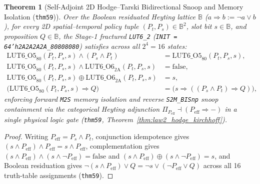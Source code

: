 \documentclass[11pt,letterpaper]{article}
\theoremstyle{spectralthm}
\newtheorem{theorem}{Theorem}[section]
\begin{document}
\begin{theorem}[Self-Adjoint 2D Hodge--Tarski Bidirectional Snoop and Memory Isolation (\texttt{thm59})]
\label{thm:hodge_tarski_snoop}
Over the Boolean residuated Heyting lattice $\mathbb{B}$ ($a \Rightarrow b := \neg a \vee b$), for every 2D spatial--temporal policy tuple $(P_t, P_s) \in \mathbb{B}^2$, slot bit $s \in \mathbb{B}$, and proposition $Q \in \mathbb{B}$, the Stage-1 fractured \texttt{LUT6\_2} (\texttt{INIT = 64'h2A2A2A2A\_80808080}) satisfies across all $2^4 = 16$ states:
\begin{equation}
\label{eq:hodge_tarski_snoop}
\begin{aligned}
\mathrm{LUT6\_O5}_{80}(P_t,P_s,s) \wedge (P_s \wedge P_t) &= \mathrm{LUT6\_O5}_{80}(P_t,P_s,s), \\
\mathrm{LUT6\_O5}_{80}(P_t,P_s,s) \wedge \mathrm{LUT6\_O6}_{2\mathrm{A}}(P_t,P_s,s) &= \mathrm{false}, \\
\mathrm{LUT6\_O5}_{80}(P_t,P_s,s) \oplus \mathrm{LUT6\_O6}_{2\mathrm{A}}(P_t,P_s,s) &= s, \\
\bigl(\mathrm{LUT6\_O5}_{80}(P_t,P_s,s) \Rightarrow Q\bigr) &= \bigl(s \Rightarrow ((P_s \wedge P_t) \Rightarrow Q)\bigr),
\end{aligned}
\end{equation}
enforcing forward \texttt{M2S} memory isolation and reverse \texttt{S2M\_BISnp} snoop containment via the categorical Heyting adjunction $\Pi_{P_{\mathrm{eff}}} \dashv (P_{\mathrm{eff}} \Rightarrow -)$ in a single physical logic gate (\texttt{thm59}, Theorem~\ref{thm:law2_hodge_kirchhoff}).
\end{theorem}
\begin{proof}
Writing $P_{\mathrm{eff}} = P_s \wedge P_t$, conjunction idempotence gives $(s \wedge P_{\mathrm{eff}}) \wedge P_{\mathrm{eff}} = s \wedge P_{\mathrm{eff}}$, complementation gives $(s \wedge P_{\mathrm{eff}}) \wedge (s \wedge \neg P_{\mathrm{eff}}) = \mathrm{false}$ and $(s \wedge P_{\mathrm{eff}}) \oplus (s \wedge \neg P_{\mathrm{eff}}) = s$, and Boolean residuation gives $\neg(s \wedge P_{\mathrm{eff}}) \vee Q = \neg s \vee (\neg P_{\mathrm{eff}} \vee Q)$ across all 16 truth-table assignments (\texttt{thm59}).
\end{proof}
\end{document}
